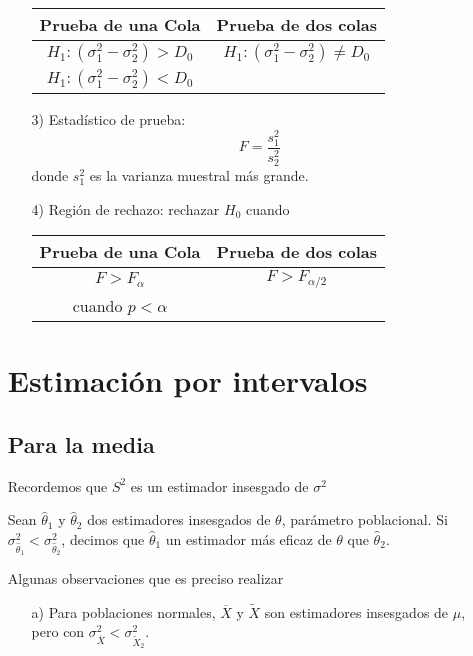 \begin{itemize}
\begin{itemize}
\begin{tabular}{cc}\hline
\textbf{Prueba de una Cola} & \textbf{Prueba de dos colas}\\\hline
$H_{1}:\left(\sigma^{2}_{1}-\sigma^{2}_{2}\right)>D_{0}$ & $H_{1}:\left(\sigma^{2}_{1}-\sigma^{2}_{2}\right)\neq D_{0}$\\ 
$H_{1}:\left(\sigma^{2}_{1}-\sigma^{2}_{2}\right)<D_{0}$&\\
\end{tabular}

\item[3) ] Estad\'istico de prueba:
$$F=\frac{s_{1}^{2}}{s_{2}^{2}}$$
donde $s_{1}^{2}$ es la varianza muestral m\'as grande.
\item[4) ] Regi\'on de rechazo: rechazar $H_{0}$ cuando
\begin{tabular}{cc}\hline
\textbf{Prueba de una Cola} & \textbf{Prueba de dos colas}\\\hline
$F>F_{\alpha}$ & $F>F_{\alpha/2}$\\
 cuando $p<\alpha$&\\
\end{tabular}
\end{itemize}

\section{Estimaci\'on por intervalos}
\subsection*{Para la media}


Recordemos que $S^{2}$ es un estimador insesgado de $\sigma^{2}$
\begin{Def}
Sean $\hat{\theta}_{1}$ y $\hat{\theta}_{2}$ dos estimadores insesgados de $\theta$, par\'ametro poblacional. Si $\sigma_{\hat{\theta}_{1}}^{2}<\sigma_{\hat{\theta}_{2}}^{2}$, decimos que $\hat{\theta}_{1}$ un estimador m\'as eficaz de $\theta$ que $\hat{\theta}_{2}$.
\end{Def}

Algunas observaciones que es preciso realizar

\begin{enumerate}
\item[a) ]Para poblaciones normales, $\overline{X}$ y $\tilde{X}$ son estimadores insesgados de $\mu$, pero con $\sigma_{\overline{X}}^{2}<\sigma_{\tilde{X}_{2}}^{2}$.


\end{enumerate}
\end{itemize}
